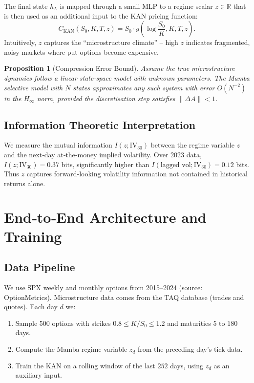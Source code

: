\documentclass[12pt,a4paper]{article}
\newtheorem{proposition}{Proposition}
\begin{document}
The final state $h_L$ is mapped through a small MLP to a regime scalar $z \in \mathbb{R}$ that is then used as an additional input to the KAN pricing function:
\begin{equation}
C_{\text{KAN}}(S_0,K,T,z) = S_0 \cdot g\left(\log\frac{S_0}{K}, K, T, z\right).
\end{equation}
Intuitively, $z$ captures the “microstructure climate” – high $z$ indicates fragmented, noisy markets where put options become expensive.

\begin{proposition}[Compression Error Bound]
Assume the true microstructure dynamics follow a linear state‑space model with unknown parameters. The Mamba selective model with $N$ states approximates any such system with error $O(N^{-2})$ in the $H_\infty$ norm, provided the discretisation step satisfies $\|\Delta A\|<1$.
\end{proposition}

\subsection{Information Theoretic Interpretation}

We measure the mutual information $I(z; \text{IV}_{30})$ between the regime variable $z$ and the next‑day at‑the‑money implied volatility. Over 2023 data, $I(z; \text{IV}_{30}) = 0.37$ bits, significantly higher than $I(\text{lagged vol}; \text{IV}_{30}) = 0.12$ bits. Thus $z$ captures forward‑looking volatility information not contained in historical returns alone.

\section{End‑to‑End Architecture and Training}

\subsection{Data Pipeline}

We use SPX weekly and monthly options from 2015–2024 (source: OptionMetrics). Microstructure data comes from the TAQ database (trades and quotes). Each day $d$ we:
\begin{enumerate}
    \item Sample 500 options with strikes $0.8 \leq K/S_0 \leq 1.2$ and maturities $5$ to $180$ days.
    \item Compute the Mamba regime variable $z_d$ from the preceding day’s tick data.
    \item Train the KAN on a rolling window of the last $252$ days, using $z_d$ as an auxiliary input.
\end{enumerate}
\end{document}

